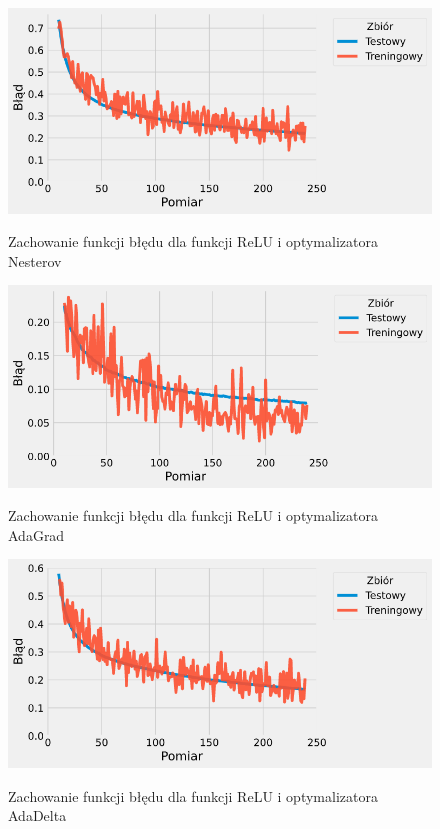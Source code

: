 \documentclass{article}
\begin{document}
\begin{figure}[H]
	\centering
	\caption{Zachowanie funkcji błędu dla funkcji ReLU i optymalizatora Nesterov}
	\includegraphics[width=\textwidth]{relu_nes_err.png}
	\label{fig:res104}
\end{figure}
\begin{figure}[H]
	\centering
	\caption{Zachowanie funkcji błędu dla funkcji ReLU i optymalizatora AdaGrad}
	\includegraphics[width=\textwidth]{relu_grad_err.png}
	\label{fig:res105}
\end{figure}
\begin{figure}[H]
	\centering
	\caption{Zachowanie funkcji błędu dla funkcji ReLU i optymalizatora AdaDelta}
	\includegraphics[width=\textwidth]{relu_delta_err.png}
	\label{fig:res106}
\end{figure}
\end{document}
